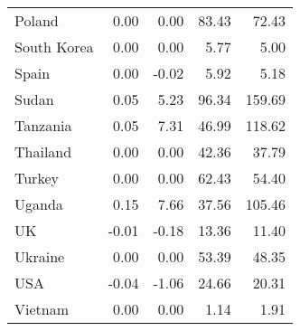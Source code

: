 \begin{table}[b]
\begin{tabular}[t]{lrrrr}
Poland & 0.00 & 0.00 & 83.43 & 72.43\\
South Korea & 0.00 & 0.00 & 5.77 & 5.00\\
Spain & 0.00 & -0.02 & 5.92 & 5.18\\
Sudan & 0.05 & 5.23 & 96.34 & 159.69\\
Tanzania & 0.05 & 7.31 & 46.99 & 118.62\\
Thailand & 0.00 & 0.00 & 42.36 & 37.79\\
Turkey & 0.00 & 0.00 & 62.43 & 54.40\\
Uganda & 0.15 & 7.66 & 37.56 & 105.46\\
UK & -0.01 & -0.18 & 13.36 & 11.40\\
Ukraine & 0.00 & 0.00 & 53.39 & 48.35\\
USA & -0.04 & -1.06 & 24.66 & 20.31\\
Vietnam & 0.00 & 0.00 & 1.14 & 1.91\\
\bottomrule
\end{tabular}
\end{table}